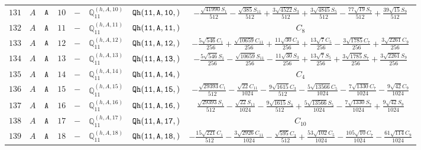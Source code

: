 \documentclass[fleqn,8pt]{jsarticle}
\begin{document}
\begin{table}[ht!]
\begin{center}
\begin{tabular}{cccccccc}
$ 131 $ & $ A $ & $ {\tt A} $ & $ 10 $ & $ - $ & $ \mathbb{Q}_{11}^{(h,A,10)} $ & $ {\tt Qh(11,A,10,)} $ & $ - \frac{\sqrt{41990} S_{1}}{512} - \frac{\sqrt{385} S_{11}}{512} + \frac{3 \sqrt{4522} S_{3}}{512} + \frac{3 \sqrt{4845} S_{5}}{512} - \frac{77 \sqrt{19} S_{7}}{512} + \frac{39 \sqrt{15} S_{9}}{512} $ \\
$ 132 $ & $ A $ & $ {\tt A} $ & $ 11 $ & $ - $ & $ \mathbb{Q}_{11}^{(h,A,11)} $ & $ {\tt Qh(11,A,11,)} $ & $ C_{8} $ \\
$ 133 $ & $ A $ & $ {\tt A} $ & $ 12 $ & $ - $ & $ \mathbb{Q}_{11}^{(h,A,12)} $ & $ {\tt Qh(11,A,12,)} $ & $ - \frac{5 \sqrt{546} C_{1}}{256} + \frac{\sqrt{10659} C_{11}}{256} + \frac{11 \sqrt{30} C_{3}}{256} + \frac{13 \sqrt{7} C_{5}}{256} - \frac{3 \sqrt{1785} C_{7}}{256} + \frac{3 \sqrt{2261} C_{9}}{256} $ \\
$ 134 $ & $ A $ & $ {\tt A} $ & $ 13 $ & $ - $ & $ \mathbb{Q}_{11}^{(h,A,13)} $ & $ {\tt Qh(11,A,13,)} $ & $ - \frac{5 \sqrt{546} S_{1}}{256} - \frac{\sqrt{10659} S_{11}}{256} - \frac{11 \sqrt{30} S_{3}}{256} + \frac{13 \sqrt{7} S_{5}}{256} + \frac{3 \sqrt{1785} S_{7}}{256} + \frac{3 \sqrt{2261} S_{9}}{256} $ \\
$ 135 $ & $ A $ & $ {\tt A} $ & $ 14 $ & $ - $ & $ \mathbb{Q}_{11}^{(h,A,14)} $ & $ {\tt Qh(11,A,14,)} $ & $ C_{4} $ \\
$ 136 $ & $ A $ & $ {\tt A} $ & $ 15 $ & $ - $ & $ \mathbb{Q}_{11}^{(h,A,15)} $ & $ {\tt Qh(11,A,15,)} $ & $ - \frac{\sqrt{29393} C_{1}}{512} - \frac{\sqrt{22} C_{11}}{1024} - \frac{9 \sqrt{1615} C_{3}}{512} - \frac{5 \sqrt{13566} C_{5}}{1024} - \frac{7 \sqrt{1330} C_{7}}{1024} - \frac{9 \sqrt{42} C_{9}}{1024} $ \\
$ 137 $ & $ A $ & $ {\tt A} $ & $ 16 $ & $ - $ & $ \mathbb{Q}_{11}^{(h,A,16)} $ & $ {\tt Qh(11,A,16,)} $ & $ \frac{\sqrt{29393} S_{1}}{512} - \frac{\sqrt{22} S_{11}}{1024} - \frac{9 \sqrt{1615} S_{3}}{512} + \frac{5 \sqrt{13566} S_{5}}{1024} - \frac{7 \sqrt{1330} S_{7}}{1024} + \frac{9 \sqrt{42} S_{9}}{1024} $ \\
$ 138 $ & $ A $ & $ {\tt A} $ & $ 17 $ & $ - $ & $ \mathbb{Q}_{11}^{(h,A,17)} $ & $ {\tt Qh(11,A,17,)} $ & $ C_{10} $ \\
$ 139 $ & $ A $ & $ {\tt A} $ & $ 18 $ & $ - $ & $ \mathbb{Q}_{11}^{(h,A,18)} $ & $ {\tt Qh(11,A,18,)} $ & $ - \frac{15 \sqrt{221} C_{1}}{512} - \frac{3 \sqrt{2926} C_{11}}{1024} - \frac{\sqrt{595} C_{3}}{512} + \frac{53 \sqrt{102} C_{5}}{1024} - \frac{105 \sqrt{10} C_{7}}{1024} - \frac{61 \sqrt{114} C_{9}}{1024} $ \\

\end{tabular}
\end{center}
\end{table}
\end{document}
